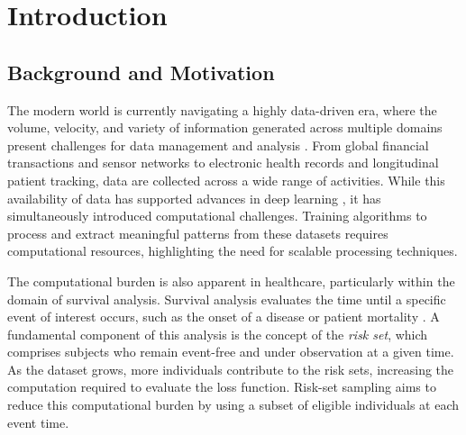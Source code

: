 \documentclass[a4paper,twoside,12pt]{report}
\begin{document}

\clearpage
{} %

\chapter{Introduction}
\label{ch:introduction}

\section{Background and Motivation}

The modern world is currently navigating a highly data-driven era, where the volume, velocity, and variety of information generated across multiple domains present challenges for data management and analysis \citep{Laney2001}. From global financial transactions and sensor networks to electronic health records and longitudinal patient tracking, data are collected across a wide range of activities. While this availability of data has supported advances in deep learning \citep{LeCun2015}, it has simultaneously introduced computational challenges. Training algorithms to process and extract meaningful patterns from these datasets requires computational resources, highlighting the need for scalable processing techniques.

The computational burden is also apparent in healthcare, particularly within the domain of survival analysis. Survival analysis evaluates the time until a specific event of interest occurs, such as the onset of a disease or patient mortality \citep{Cox1972}. A fundamental component of this analysis is the concept of the \textit{risk set}, which comprises subjects who remain event-free and under observation at a given time. As the dataset grows, more individuals contribute to the risk sets, increasing the computation required to evaluate the loss function. Risk-set sampling aims to reduce this computational burden by using a subset of eligible individuals at each event time.
\end{document}
